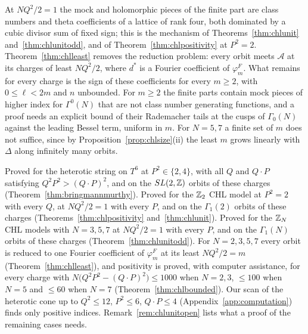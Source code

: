 \begin{remark}\label{rem:chlunitopen}
At $NQ^2/2=1$ the mock and holomorphic pieces of the finite part are class numbers and theta coefficients of a lattice of rank four, both dominated by a cubic divisor sum of fixed sign; this is the mechanism of Theorems~\ref{thm:chlunit} and~\ref{thm:chlunitodd}, and of Theorem~\ref{thm:chlpositivity} at $P^2=2$. Theorem~\ref{thm:chlleast} removes the reduction problem: every orbit meets $\mathcal A$ at its charges of least $NQ^2/2$, where $d^*$ is a Fourier coefficient of $\varphi^F_m$. What remains for every charge is the sign of these coefficients for every $m\ge2$, with $0\le\ell<2m$ and $n$ unbounded. For $m\ge2$ the finite parts contain mock pieces of higher index for $\Gamma^0(N)$ that are not class number generating functions, and a proof needs an explicit bound of their Rademacher tails at the cusps of $\Gamma_0(N)$ against the leading Bessel term, uniform in $m$. For $N=5,7$ a finite set of $m$ does not suffice, since by Proposition~\ref{prop:chlsize}(ii) the least $m$ grows linearly with $\Delta$ along infinitely many orbits.
\end{remark}

\begin{verdict}
Proved for the heterotic string on $T^6$ at $P^2\in\{2,4\}$, with all $Q$ and $Q\cdot P$ satisfying $Q^2P^2>(Q\cdot P)^2$, and on the $SL(2,\mathbb{Z})$ orbits of these charges (Theorem~\ref{thm:bringmannmurthy}). Proved for the $\mathbb{Z}_2$ CHL model at $P^2=2$ with every $Q$, at $NQ^2/2=1$ with every $P$, and on the $\Gamma_1(2)$ orbits of these charges (Theorems~\ref{thm:chlpositivity} and~\ref{thm:chlunit}). Proved for the $\mathbb{Z}_N$ CHL models with $N=3,5,7$ at $NQ^2/2=1$ with every $P$, and on the $\Gamma_1(N)$ orbits of these charges (Theorem~\ref{thm:chlunitodd}). For $N=2,3,5,7$ every orbit is reduced to one Fourier coefficient of $\varphi^F_m$ at its least $NQ^2/2=m$ (Theorem~\ref{thm:chlleast}), and positivity is proved, with computer assistance, for every charge with $N\big(Q^2P^2-(Q\cdot P)^2\big)\le1000$ when $N=2,3$, $\le100$ when $N=5$ and $\le60$ when $N=7$ (Theorem~\ref{thm:chlbounded}). Our scan of the heterotic cone up to $Q^2\le 12$, $P^2\le 6$, $Q\cdot P\le 4$ (Appendix~\ref{app:computation}) finds only positive indices.  Remark~\ref{rem:chlunitopen} lists what a proof of the remaining cases needs.
\end{verdict}

